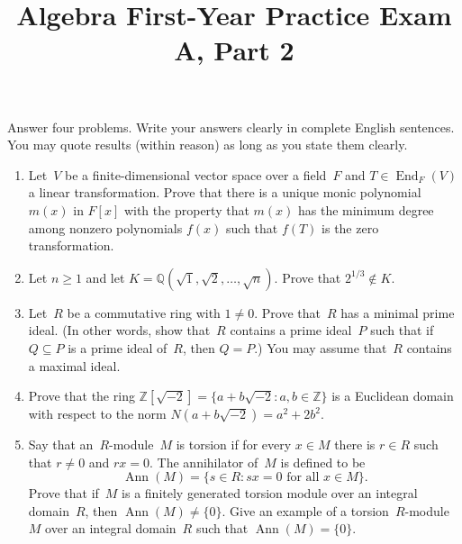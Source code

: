 \documentclass[11pt,letterpaper]{article}
\title{Algebra First-Year Practice Exam A, Part 2}
\author{}
\date{}
\newenvironment{examproblems}[2]{%
  \def\ProblemHeadingTag{#2}%
  \AssignTaggingSocketPlug{block/list/label}{examproblem}%
  \begin{enumerate}%
  \setcounter{enumi}{#1}%
  \renewcommand{\labelenumi}{\textbf{\theenumi.}}%
  \setlength{\topsep}{0.35em}%
  \setlength{\partopsep}{0pt}%
  \setlength{\itemsep}{0.48em}%
  \setlength{\parsep}{0.18em}%
}{\end{enumerate}}
\newenvironment{examinstructions}{%
  \par\begingroup\itshape
}{%
  \par\endgroup\vspace{0.18em}
}
\begin{document}
\maketitle
\thispagestyle{empty}
\begin{examinstructions}
Answer four problems. Write your answers clearly in complete English sentences. You may quote results (within reason) as long as you state them clearly.
\end{examinstructions}
\begin{examproblems}{0}{H2}
\def\ProblemHeadingText{Problem 1.}
\item
Let~\(V\) be a finite-dimensional vector space over a field~\(F\) and \(T \in \operatorname{End}_F(V)\) a linear transformation. Prove that there is a unique monic polynomial \(m(x)\) in \(F[x]\) with the property that \(m(x)\) has the minimum degree among nonzero polynomials \(f(x)\) such that \(f(T)\) is the zero transformation.
\def\ProblemHeadingText{Problem 2.}
\item
Let \(n \geq 1\) and let \(K=\mathbb{Q}(\sqrt{1},\sqrt{2},\ldots,\sqrt{n})\). Prove that \(2^{1/3}\notin K\).
\def\ProblemHeadingText{Problem 3.}
\item
Let~\(R\) be a commutative ring with \(1\neq 0\). Prove that~\(R\) has a minimal prime ideal. (In other words, show that~\(R\) contains a prime ideal~\(P\) such that if \(Q\subseteq P\) is a prime ideal of~\(R\), then \(Q=P\).) You may assume that~\(R\) contains a maximal ideal.
\def\ProblemHeadingText{Problem 4.}
\item
Prove that the ring \(\mathbb{Z}[\sqrt{-2}]=\{a+b\sqrt{-2}:a,b\in\mathbb{Z}\}\) is a Euclidean domain with respect to the norm \(N(a+b\sqrt{-2})=a^2+2b^2\).
\def\ProblemHeadingText{Problem 5.}
\item
Say that an~\(R\)-module~\(M\) is torsion if for every \(x\in M\) there is \(r\in R\) such that \(r\neq 0\) and \(rx=0\). The annihilator of~\(M\) is defined to be
\[
\operatorname{Ann}(M)=\{s\in R:sx=0\text{ for all }x\in M\}.
\]
 Prove that if~\(M\) is a finitely generated torsion module over an integral domain~\(R\), then \(\operatorname{Ann}(M)\neq\{0\}\). Give an example of a torsion~\(R\)-module~\(M\) over an integral domain~\(R\) such that \(\operatorname{Ann}(M)=\{0\}\).
\end{examproblems}
\end{document}
